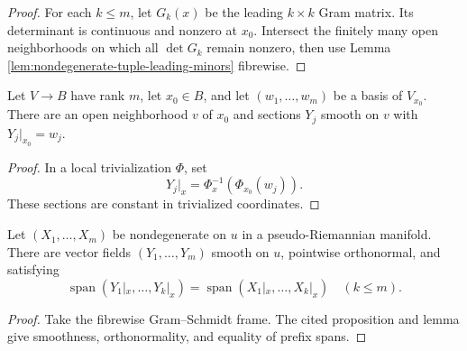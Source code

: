 \begin{proof}
\leanok
{}
\sketch For each $k\leq m$, let $G_k(x)$ be the leading $k\times k$ Gram matrix.
Its determinant is continuous and nonzero at $x_0$. Intersect the finitely many
open neighborhoods on which all $\det G_k$ remain nonzero, then use Lemma
\ref{lem:nondegenerate-tuple-leading-minors} fibrewise.
\end{proof}

\begin{lemma}
\label{lem:sections-through-prescribed-basis}
\leanok
Let $V\to B$ have rank $m$, let $x_0\in B$, and let
$(w_1,\ldots,w_m)$ be a basis of $V_{x_0}$. There are an open neighborhood
$v$ of $x_0$ and sections $Y_j$ smooth on $v$ with $Y_j|_{x_0}=w_j$.
\end{lemma}

\begin{proof}
\leanok
\sketch In a local trivialization $\Phi$, set
\[
Y_j|_x=\Phi_x^{-1}(\Phi_{x_0}(w_j)).
\]
These sections are constant in trivialized coordinates.
\end{proof}

\begin{proposition}
\label{prop:orthonormalize-nondegenerate-family}
\leanok
{}
Let $(X_1,\ldots,X_m)$ be nondegenerate on $u$ in a pseudo-Riemannian manifold.
There are vector fields $(Y_1,\ldots,Y_m)$ smooth on $u$, pointwise orthonormal,
and satisfying
\[
\operatorname{span}(Y_1|_x,\ldots,Y_k|_x)
=\operatorname{span}(X_1|_x,\ldots,X_k|_x)
\quad(k\leq m).
\]
\end{proposition}

\begin{proof}
\leanok
{}
\sketch Take the fibrewise Gram--Schmidt frame. The cited proposition and lemma
give smoothness, orthonormality, and equality of prefix spans.
\end{proof}

